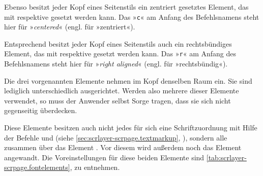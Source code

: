 Ebenso besitzt jeder Kopf eines Seitenstils ein zentriert
gesetztes Element, das mit  respektive  gesetzt
werden kann. Das »\texttt{c}« am Anfang des Befehlsnamens steht hier für
»\emph{centered}« (engl. für »zentriert«).

Entsprechend besitzt jeder Kopf eines Seitenstils auch ein
rechtsbündiges Element, das mit 
respektive  gesetzt werden kann. Das »\texttt{r}« am Anfang des
Befehlsnamens steht hier für »\emph{right aligned}« (engl. für
»rechtsbündig«).

Die drei vorgenannten Elemente nehmen im Kopf denselben
Raum ein. Sie sind lediglich unterschiedlich ausgerichtet. Werden also mehrere
dieser Elemente verwendet, so muss der Anwender selbst Sorge tragen, dass sie
sich nicht gegenseitig überdecken.

\BeginIndexGroup
{}%
%
Diese Elemente besitzen auch nicht jedes für sich eine Schriftzuordnung mit
Hilfe der Befehle  und
 (siehe
\autoref{sec:scrlayer-scrpage.textmarkup},
), sondern alle zusammen über das
Element . Vor diesem
wird außerdem noch das Element
angewandt. Die Voreinstellungen für diese beiden Elemente sind
\autoref{tab:scrlayer-scrpage.fontelements},
 zu entnehmen.%
\EndIndexGroup

